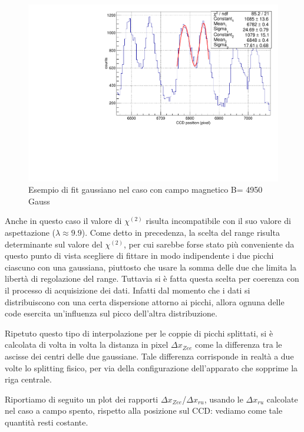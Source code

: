 \documentclass{article}
\begin{document}
	\begin{center}
		\begin{figure}[H]
			\centering
			\includegraphics[scale=0.38, angle=0]{campomax/singolo.pdf}
			\caption{ Esempio di fit gaussiano nel caso con campo magnetico B= 4950 Gauss}
			\label{fig:singoloBonMax}
		\end{figure}
	\end{center}

	Anche in questo caso il valore di $\chi^{(2)}$ risulta incompatibile con il suo
	valore di aspettazione ($\lambda \approx 9.9$). Come detto in precedenza, la scelta
	del range risulta determinante sul valore del $\chi^{(2)}$, per cui sarebbe forse
	stato più conveniente da questo punto di vista scegliere di fittare in modo indipendente
	i due picchi ciascuno con una gaussiana, piuttosto che usare la somma delle due che 
	limita la libertà di regolazione del range. Tuttavia si è fatta questa scelta per coerenza
	con il processo di acquisizione dei dati. Infatti dal momento che i dati si distribuiscono
	con una certa dispersione attorno ai picchi, allora ognuna delle code esercita un'influenza
	sul picco dell'altra distribuzione.


	Ripetuto questo tipo di interpolazione per le coppie di picchi splittati, si è calcolata di volta 
	in volta la distanza in pixel $\Delta x_{Zee}$ come la differenza tra le ascisse dei centri delle due
	gaussiane. Tale differenza corrisponde in realtà a due volte lo splitting fisico, per via della 
	configurazione dell'apparato che sopprime la riga centrale.

	Riportiamo di seguito un plot dei rapporti $\Delta x_{Zee}$/$\Delta x_{ru}$, usando le $\Delta x_{ru}$
	calcolate nel caso a campo spento, rispetto alla posizione sul CCD: vediamo come tale quantità resti 
	costante.
\end{document}

